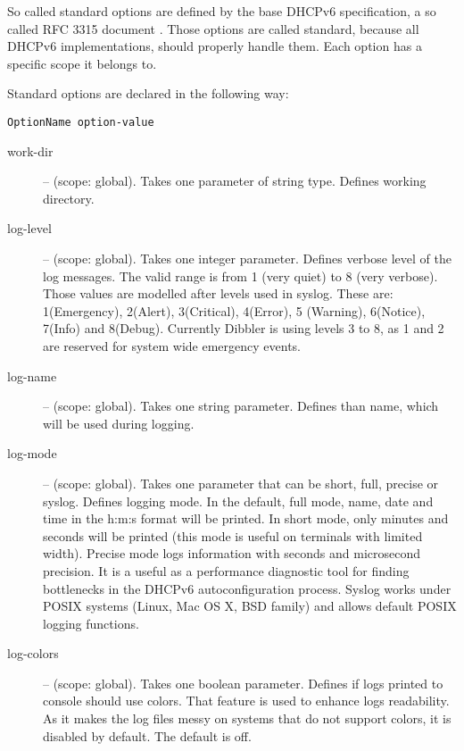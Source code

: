 So called standard options are defined by the base DHCPv6 specification,
a so called RFC 3315 document \cite{rfc3315}. Those options are
called standard, because all DHCPv6 implementations, should properly
handle them. Each option has a specific scope it belongs to.

Standard options are declared in the following way:

\begin{lstlisting}
OptionName option-value
\end{lstlisting}

\begin{description}
\item[work-dir] -- (scope: global). Takes one parameter of string
  type. Defines working directory.

\item[log-level] -- (scope: global). Takes one integer
  parameter. Defines verbose level of the log messages. The valid range
  is from 1 (very quiet) to 8 (very verbose). Those values are modelled
  after levels used in syslog. These are: 1(Emergency), 2(Alert),
  3(Critical), 4(Error), 5 (Warning), 6(Notice), 7(Info) and
  8(Debug). Currently Dibbler is using levels 3 to 8, as 1 and 2 are
  reserved for system wide emergency events.

\item[log-name] -- (scope: global). Takes one string
  parameter. Defines than name, which will be used during logging.

\item[log-mode] -- (scope: global). Takes one parameter that can be
  short, full, precise or syslog. Defines logging mode. In the
  default, full mode, name, date and time in the h:m:s format will be
  printed. In short mode, only minutes and seconds will be printed
  (this mode is useful on terminals with limited width). Precise mode
  logs information with seconds and microsecond precision. It is a
  useful as a performance diagnostic tool for finding bottlenecks in
  the DHCPv6 autoconfiguration process. Syslog works under POSIX
  systems (Linux, Mac OS X, BSD family) and allows default POSIX
  logging functions.
  
\item[log-colors] -- (scope: global). Takes one boolean parameter.
  Defines if logs printed to console should use colors. That feature
  is used to enhance logs readability.  As it makes the log files
  messy on systems that do not support colors, it is disabled by
  default. The default is off.


\end{description}
